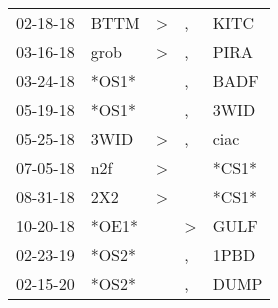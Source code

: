 \begin{supertabular}{p{0.07\textwidth}p{0.06\textwidth}p{0.02\textwidth}p{0.02\textwidth}p{0.06\textwidth}}
 02-18-18\textsuperscript{} &  BTTM\textsuperscript{} &  \textgreater &             , &  KITC\textsuperscript{} \\
 03-16-18\textsuperscript{} &  grob\textsuperscript{} &  \textgreater &             , &  PIRA\textsuperscript{} \\
 03-24-18\textsuperscript{} &                   *OS1* &               &             , &  BADF\textsuperscript{} \\
 05-19-18\textsuperscript{} &                   *OS1* &               &             , &  3WID\textsuperscript{} \\
 05-25-18\textsuperscript{} &  3WID\textsuperscript{} &  \textgreater &             , &  ciac\textsuperscript{} \\
 07-05-18\textsuperscript{} &   n2f\textsuperscript{} &  \textgreater &               &                   *CS1* \\
 08-31-18\textsuperscript{} &   2X2\textsuperscript{} &  \textgreater &               &                   *CS1* \\
 10-20-18\textsuperscript{} &                   *OE1* &               &  \textgreater &  GULF\textsuperscript{} \\
 02-23-19\textsuperscript{} &                   *OS2* &               &             , &  1PBD\textsuperscript{} \\
 02-15-20\textsuperscript{} &                   *OS2* &               &             , &  DUMP\textsuperscript{} \\
\end{supertabular}
